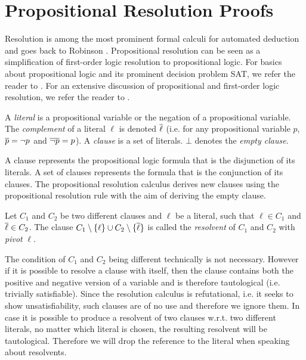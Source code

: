 \section{Propositional Resolution Proofs}
\label{sec:resolution}

Resolution is among the most prominent formal calculi for automated deduction and goes back to Robinson \cite{Robinson1965}.
Propositional resolution can be seen as a simplification of first-order logic resolution to propositional logic.
For basics about propositional logic and its prominent decision problem SAT, we refer the reader to \cite{Biere2009}.
For an extensive discussion of propositional and first-order logic resolution, we refer the reader to \cite{Leitsch1997}.

\begin{definition}

A \emph{literal} is a propositional variable or the negation of a propositional variable. 
The \emph{complement} of a literal $\ell$ is denoted $\overline{\ell}$ (i.e. for any propositional variable $p$,
$\overline{p} = \neg p$ and $\overline{\neg p} = p$). 
A \emph{clause} is a set of literals. 
$\bot$ denotes the \emph{empty clause}.

\end{definition}

A clause represents the propositional logic formula that is the disjunction of its literals.
A set of clauses represents the formula that is the conjunction of its clauses.
The propositional resolution calculus derives new clauses using the propositional resolution rule with the aim of deriving the empty clause.

\begin{definition}[Resolvent]

Let $C_1$ and $C_2$ be two different clauses and $\ell$ be a literal, such that $\ell \in C_1$ and $\overline{\ell} \in C_2$.
The clause $C_1 \setminus \{\ell\} \cup C_2 \setminus \{\overline{\ell}\}$ is called the \emph{resolvent} of $C_1$ and $C_2$ with \emph{pivot} $\ell$.

\end{definition}

The condition of $C_1$ and $C_2$ being different technically is not necessary.
However if it is possible to resolve a clause with itself, then the clause contains both the positive and negative version of a variable and is therefore tautological (i.e. trivially satisfiable).
Since the resolution calculus is refutational, i.e. it seeks to show unsatisfiability, such clauses are of no use and therefore we ignore them.
In case it is possible to produce a resolvent of two clauses w.r.t. two different literals, no matter which literal is chosen, the resulting resolvent will be tautological.
Therefore we will drop the reference to the literal when speaking about resolvents.

